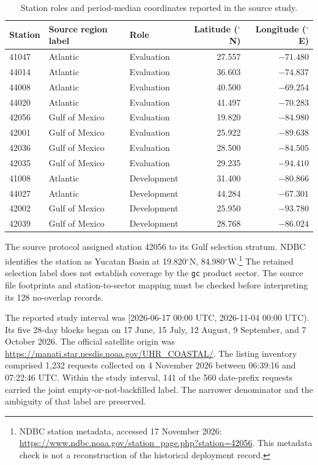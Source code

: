 \begin{table}[htbp]
\caption{Station roles and period-median coordinates reported in the source study.}
\label{tab:supp-stations}
\centering
\small
\begin{tabularx}{\textwidth}{@{}lXlrr@{}}
\toprule
Station & Source region label & Role & Latitude ($^\circ$N) & Longitude ($^\circ$E) \\
\midrule
41047 & Atlantic & Evaluation & 27.557 & $-71.480$ \\
44014 & Atlantic & Evaluation & 36.603 & $-74.837$ \\
44008 & Atlantic & Evaluation & 40.500 & $-69.254$ \\
44020 & Atlantic & Evaluation & 41.497 & $-70.283$ \\
42056 & Gulf of Mexico & Evaluation & 19.820 & $-84.980$ \\
42001 & Gulf of Mexico & Evaluation & 25.922 & $-89.638$ \\
42036 & Gulf of Mexico & Evaluation & 28.500 & $-84.505$ \\
42035 & Gulf of Mexico & Evaluation & 29.235 & $-94.410$ \\
41008 & Atlantic & Development & 31.400 & $-80.866$ \\
44027 & Atlantic & Development & 44.284 & $-67.301$ \\
42002 & Gulf of Mexico & Development & 25.950 & $-93.780$ \\
42039 & Gulf of Mexico & Development & 28.768 & $-86.024$ \\
\bottomrule
\end{tabularx}
\end{table}

The source protocol assigned station 42056 to its Gulf selection stratum. NDBC identifies the station as Yucatan Basin at 19.820$^\circ$N, 84.980$^\circ$W.\footnote{NDBC station metadata, accessed 17 November 2026: \url{https://www.ndbc.noaa.gov/station_page.php?station=42056}. This metadata check is not a reconstruction of the historical deployment record.} The retained selection label does not establish coverage by the \texttt{gc} product sector. The source file footprints and station-to-sector mapping must be checked before interpreting its 128 no-overlap records.

The reported study interval was [2026-06-17 00:00 UTC, 2026-11-04 00:00 UTC). Its five 28-day blocks began on 17 June, 15 July, 12 August, 9 September, and 7 October 2026. The official satellite origin was \url{https://manati.star.nesdis.noaa.gov/UHR_COASTAL/}. The listing inventory comprised 1,232 requests collected on 4 November 2026 between 06:39:16 and 07:22:46 UTC. Within the study interval, 141 of the 560 date-prefix requests carried the joint empty-or-not-backfilled label. The narrower denominator and the ambiguity of that label are preserved.

